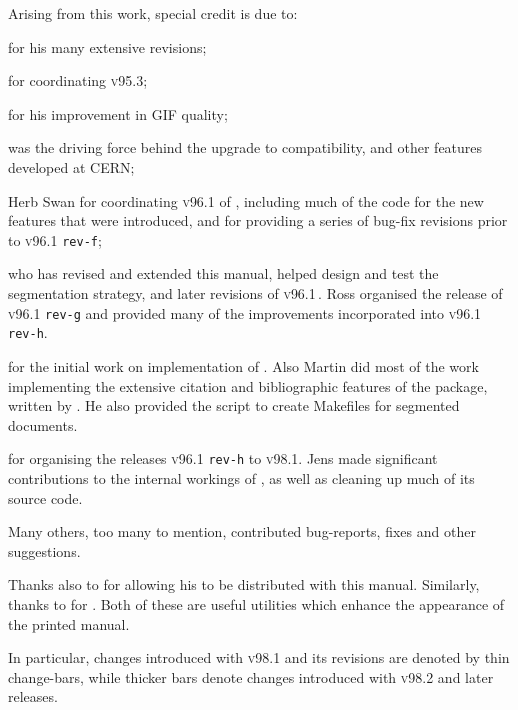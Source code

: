 \bigskip\noindent
Arising from this work, special credit is due to: 
\begin{htmllist}
\item [\Hennecke] for his many extensive revisions; 

\item [\Noworolski] for coordinating \textsc{v95.3};
 
\item [\Isani] for his improvement in GIF quality; 

%
\item [\Goossens]
was the driving force behind the upgrade to \LaTeXe{} compatibility,
and other features developed at CERN;

\item [Herb Swan]
for coordinating \textsc{v96.1} of \latextohtml, 
including much of the \Perl{} code 
for the new features that were introduced,
and for providing a series of bug-fix revisions 
prior to  \textsc{v96.1} \texttt{rev-f};

\item [\RossMoore]
who has revised and extended this manual, helped design and test the 
segmentation strategy, and later revisions of \textsc{v96.1}\,.
Ross organised the release of \textsc{v96.1} \texttt{rev-g} 
and provided many of the improvements
incorporated into \textsc{v96.1} \texttt{rev-h}. 

\item [\Wilck]
for the initial work on implementation of . 
Also Martin did most of the work implementing the extensive citation and
bibliographic features of the  package, written by \PatrickDaly.
He also provided the  \Perl{} script to create Makefiles
for segmented documents.

\item [\Lippmann]
for organising the releases \textsc{v96.1} \texttt{rev-h} to \textsc{v98.1}. 
Jens made significant contributions to
the internal workings of \latextohtml, 
as well as cleaning up much of its source code. 
\end{htmllist}

\htmlrule


\bigskip\noindent
Many others, too many to mention, contributed bug-reports, 
fixes and other suggestions.

\latex{\bigskip}\htmlrule

%
\noindent
Thanks also to \Arseneau{} for allowing his  
to be distributed with this manual. 
Similarly, thanks to \JohannesBraams{} for .
%
\html{\\}
Both of these are useful utilities which enhance the appearance of the printed manual. 
\begin{latexonly}
In particular, changes introduced with  \textsc{v98.1} and its revisions are denoted 
by thin change-bars, while thicker bars denote changes introduced with  \textsc{v98.2}
and later releases.%
\end{latexonly}



